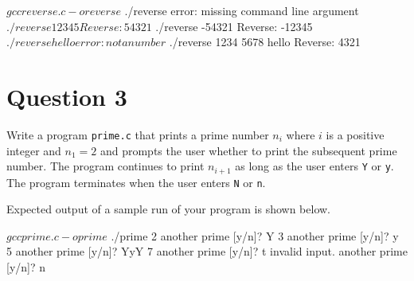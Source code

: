 \documentclass[12pt,letterpaper,twoside]{article}
\begin{document}
\begin{terminal}
$ gcc reverse.c -o reverse
$ ./reverse
error: missing command line argument
$ ./reverse 12345
Reverse: 54321
$ ./reverse -54321
Reverse: -12345
$ ./reverse hello
error: not a number
$ ./reverse 1234 5678 hello
Reverse: 4321
\end{terminal}

\section*{Question 3}

Write a program \texttt{prime.c} that prints a prime number $n_i$ where $i$ is a positive integer and $n_1 = 2$ and prompts the user whether to print the subsequent prime number.
The program continues to print $n_{i+1}$ as long as the user enters \texttt{Y} or \texttt{y}.
The program terminates when the user enters \texttt{N} or \texttt{n}.

Expected output of a sample run of your program is shown below.

\begin{terminal}
$ gcc prime.c -o prime
$ ./prime
2
another prime [y/n]? Y
3
another prime [y/n]? y
5
another prime [y/n]? YyY
7
another prime [y/n]? t
invalid input.
another prime [y/n]? n
\end{terminal}

\newpage

\end{document}
